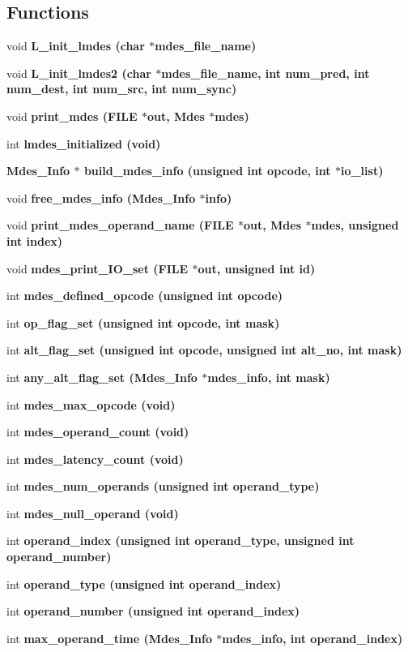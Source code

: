 \subsection*{Functions}
\begin{CompactItemize}
\item 
void \bf{L\_\-init\_\-lmdes} (char $\ast$mdes\_\-file\_\-name)
\item 
void \bf{L\_\-init\_\-lmdes2} (char $\ast$mdes\_\-file\_\-name, int num\_\-pred, int num\_\-dest, int num\_\-src, int num\_\-sync)
\item 
void \bf{print\_\-mdes} (FILE $\ast$out, \bf{Mdes} $\ast$mdes)
\item 
int \bf{lmdes\_\-initialized} (void)
\item 
\bf{Mdes\_\-Info} $\ast$ \bf{build\_\-mdes\_\-info} (unsigned int opcode, int $\ast$io\_\-list)
\item 
void \bf{free\_\-mdes\_\-info} (\bf{Mdes\_\-Info} $\ast$info)
\item 
void \bf{print\_\-mdes\_\-operand\_\-name} (FILE $\ast$out, \bf{Mdes} $\ast$mdes, unsigned int index)
\item 
void \bf{mdes\_\-print\_\-IO\_\-set} (FILE $\ast$out, unsigned int id)
\item 
int \bf{mdes\_\-defined\_\-opcode} (unsigned int opcode)
\item 
int \bf{op\_\-flag\_\-set} (unsigned int opcode, int mask)
\item 
int \bf{alt\_\-flag\_\-set} (unsigned int opcode, unsigned int alt\_\-no, int mask)
\item 
int \bf{any\_\-alt\_\-flag\_\-set} (\bf{Mdes\_\-Info} $\ast$mdes\_\-info, int mask)
\item 
int \bf{mdes\_\-max\_\-opcode} (void)
\item 
int \bf{mdes\_\-operand\_\-count} (void)
\item 
int \bf{mdes\_\-latency\_\-count} (void)
\item 
int \bf{mdes\_\-num\_\-operands} (unsigned int operand\_\-type)
\item 
int \bf{mdes\_\-null\_\-operand} (void)
\item 
int \bf{operand\_\-index} (unsigned int operand\_\-type, unsigned int operand\_\-number)
\item 
int \bf{operand\_\-type} (unsigned int operand\_\-index)
\item 
int \bf{operand\_\-number} (unsigned int operand\_\-index)
\item 
int \bf{max\_\-operand\_\-time} (\bf{Mdes\_\-Info} $\ast$mdes\_\-info, int operand\_\-index)

\end{CompactItemize}
